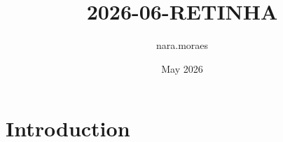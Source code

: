 \documentclass{article}
\title{2026-06-RETINHA}
\author{nara.moraes }
\date{May 2026}
\begin{document}
\maketitle

\section{Introduction}
\end{document}

